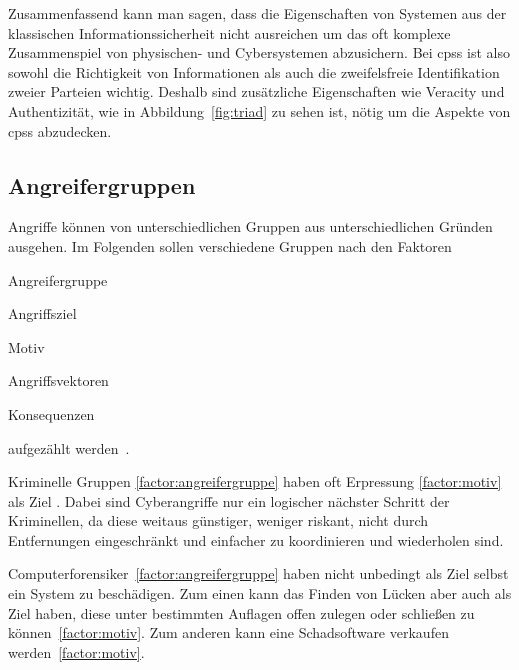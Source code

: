 \documentclass[final,bibliography=totocnumbered]{include/sikseminar}
\newcommand{\cps}{\glspl{cps}\xspace}
\begin{document}
Zusammenfassend kann man sagen, dass die Eigenschaften von Systemen aus der klassischen Informationssicherheit nicht ausreichen um das oft komplexe Zusammenspiel von physischen- und Cybersystemen abzusichern.
Bei \cps ist also sowohl die Richtigkeit von Informationen als auch die zweifelsfreie Identifikation zweier Parteien wichtig.
Deshalb sind zusätzliche Eigenschaften wie Veracity und Authentizität, wie in Abbildung~\ref{fig:triad} zu sehen ist, nötig um die Aspekte von \cps abzudecken.


\subsection{Angreifergruppen}\label{subsec:angreifergruppen}

Angriffe können von unterschiedlichen Gruppen aus unterschiedlichen Gründen ausgehen.
Im Folgenden sollen verschiedene Gruppen nach den Faktoren
\begin{enumerate*}[label=(\alph*),before=\unskip{: }, itemjoin={{; }}, itemjoin*={{, und }}]
    \item Angreifergruppe\label{factor:angreifergruppe}
    \item Angriffsziel\label{factor:target}
    \item Motiv\label{factor:motiv}
    \item Angriffsvektoren\label{factor:methode}
    \item Konsequenzen\label{factor:konsequenz}
\end{enumerate*} aufgezählt werden~\cite{HLL+17}.

Kriminelle Gruppen \ref{factor:angreifergruppe} haben oft Erpressung \ref{factor:motiv} als Ziel \cite{WYX+10}.
Dabei sind Cyberangriffe nur ein logischer nächster Schritt der Kriminellen, da diese weitaus günstiger, weniger riskant, nicht durch Entfernungen eingeschränkt und einfacher zu koordinieren und wiederholen sind. \cite{CAS+09}

Computerforensiker~\ref{factor:angreifergruppe} haben nicht unbedingt als Ziel selbst ein System zu beschädigen.
Zum einen kann das Finden von Lücken aber auch als Ziel haben, diese unter bestimmten Auflagen offen zulegen oder schließen zu können~\ref{factor:motiv}. 
Zum anderen kann eine Schadsoftware verkaufen werden~\ref{factor:motiv}. 
\end{document}

